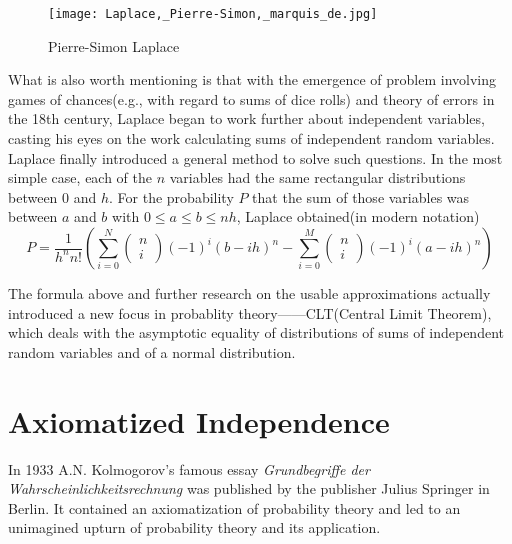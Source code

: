\documentclass{article}
\begin{document}
\begin{figure}
    \centering
    \texttt{[image: Laplace,\_Pierre-Simon,\_marquis\_de.jpg]}
    \caption{Pierre-Simon Laplace}
    \label{fig:my_label}
\end{figure}
What is also worth mentioning is that with the emergence of problem involving games of chances(e.g., with regard to sums of dice rolls) and theory of errors in the 18th century, Laplace began to work further about independent variables, casting his eyes on the work calculating sums of independent random variables. Laplace finally introduced a general method to solve such questions. In the most simple case, each of the $n$ variables had the same rectangular distributions between $0$ and $h$. For the probability $P$ that the sum of those variables was between $a$ and $b$ with $0 \leq a \leq b \leq nh$, Laplace obtained(in modern notation)
\begin{equation*}
P=\frac{1}{h^n n!}\left(\sum_{i=0}^{N}\left(
\begin{array}{l}
n \\
i
\end{array}
\right)(-1)^{i}(b-ih)^{n}-\sum_{i=0}^{M}\left(\begin{array}{l}
n \\
i
\end{array}\right)(-1)^{i}(a-i h)^{n}\right)
\end{equation*}

The formula above and further research on the usable approximations actually introduced a new focus in probablity theory——CLT(Central Limit Theorem), which deals with the asymptotic equality of distributions of sums of independent random variables and of a normal distribution.

\section{Axiomatized Independence}
In 1933 A.N. Kolmogorov’s famous essay \textit{Grundbegriﬀe der Wahrscheinlichkeitsrechnung} was published by the publisher Julius Springer in Berlin. It contained an axiomatization of probability theory and led to an unimagined upturn of probability theory and its application.
\end{document}
